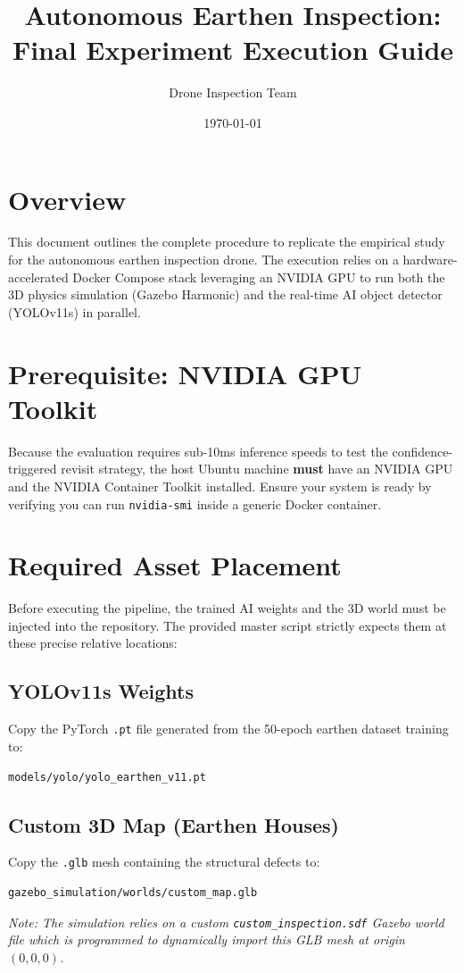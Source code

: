 \documentclass[11pt,a4paper]{article}
\title{\textbf{Autonomous Earthen Inspection:\\Final Experiment Execution Guide}}
\author{Drone Inspection Team}
\date{\today}
\begin{document}
\maketitle

\section{Overview}
This document outlines the complete procedure to replicate the empirical study for the autonomous earthen inspection drone. The execution relies on a hardware-accelerated Docker Compose stack leveraging an NVIDIA GPU to run both the 3D physics simulation (Gazebo Harmonic) and the real-time AI object detector (YOLOv11s) in parallel.

\section{Prerequisite: NVIDIA GPU Toolkit}
Because the evaluation requires sub-10ms inference speeds to test the confidence-triggered revisit strategy, the host Ubuntu machine \textbf{must} have an NVIDIA GPU and the NVIDIA Container Toolkit installed. Ensure your system is ready by verifying you can run \texttt{nvidia-smi} inside a generic Docker container.

\section{Required Asset Placement}
Before executing the pipeline, the trained AI weights and the 3D world must be injected into the repository. The provided master script strictly expects them at these precise relative locations:

\subsection{YOLOv11s Weights}
Copy the PyTorch \texttt{.pt} file generated from the 50-epoch earthen dataset training to:
\begin{lstlisting}
models/yolo/yolo_earthen_v11.pt
\end{lstlisting}

\subsection{Custom 3D Map (Earthen Houses)}
Copy the \texttt{.glb} mesh containing the structural defects to:
\begin{lstlisting}
gazebo_simulation/worlds/custom_map.glb
\end{lstlisting}
\textit{Note: The simulation relies on a custom \texttt{custom\_inspection.sdf} Gazebo world file which is programmed to dynamically import this GLB mesh at origin $(0,0,0)$.}
\end{document}
